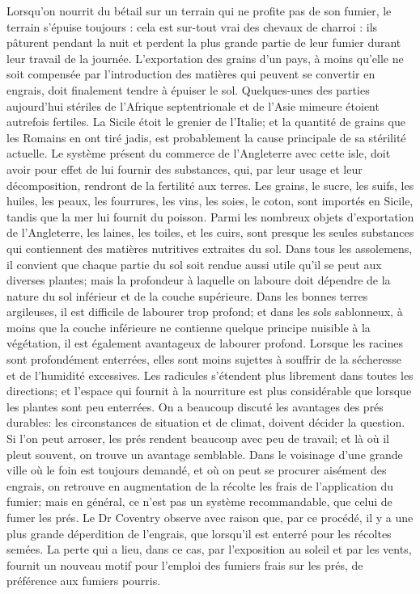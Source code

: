 Lorsqu'on nourrit du bétail sur un terrain qui ne profite pas de son fumier, le terrain s'épuise toujours : cela est sur-tout vrai des chevaux de charroi : ils pâturent pendant la nuit et perdent la plus grande partie de leur fumier durant leur travail de la journée.
L'exportation des grains d'un pays, à moins qu'elle ne soit compensée par l'introduction des matières qui peuvent se convertir en engrais, doit finalement tendre à épuiser le sol. Quelques-unes des parties aujourd'hui stériles de l'Afrique septentrionale et de l'Asie mimeure\setcounter{page}{287} étoient autrefois fertiles. La Sicile étoit le grenier de l'Italie; et la quantité de grains que les Romains en ont tiré jadis, est probablement la cause principale de sa stérilité actuelle. Le système présent du commerce de l'Angleterre avec cette isle, doit avoir pour effet de lui fournir des substances, qui, par leur usage et leur décomposition, rendront de la fertilité aux terres. Les grains, le sucre, les suifs, les huiles, les peaux, les fourrures, les vins, les soies, le coton, sont importés en Sicile, tandis que la mer lui fournit du poisson. Parmi les nombreux objets d'exportation de l'Angleterre, les laines, les toiles, et les cuirs, sont presque les seules substances qui contiennent des matières nutritives extraites du sol.
Dans tous les assolemens, il convient que chaque partie du sol soit rendue aussi utile qu'il se peut aux diverses plantes; mais la profondeur à laquelle on laboure doit dépendre de la nature du sol inférieur et de la couche supérieure. Dans les bonnes terres argileuses, il est difficile de labourer trop profond; et dans les sols sablonneux, à moins que la couche inférieure ne contienne quelque principe nuisible à la végétation, il est également avantageux de labourer profond.\setcounter{page}{288} Lorsque les racines sont profondément enterrées, elles sont moins sujettes à souffrir de la sécheresse et de l'humidité excessives. Les radicules s'étendent plus librement dans toutes les directions; et l'espace qui fournit à la nourriture est plus considérable que lorsque les plantes sont peu enterrées.
On a beaucoup discuté les avantages des prés durables: les circonstances de situation et de climat, doivent décider la question. Si l'on peut arroser, les prés rendent beaucoup avec peu de travail; et là où il pleut souvent, on trouve un avantage semblable. Dans le voisinage d'une grande ville où le foin est toujours demandé, et où on peut se procurer aisément des engrais, on retrouve en augmentation de la récolte les frais de l'application du fumier; mais en général, ce n'est pas un système recommandable, que celui de fumer les prés. Le Dr Coventry observe avec raison que, par ce procédé, il y a une plus grande déperdition de l'engrais, que lorsqu'il est enterré pour les récoltes semées. La perte qui a lieu, dans ce cas, par l'exposition au soleil et par les vents, fournit un nouveau motif pour l'emploi des fumiers frais sur les prés, de préférence aux fumiers pourris.
